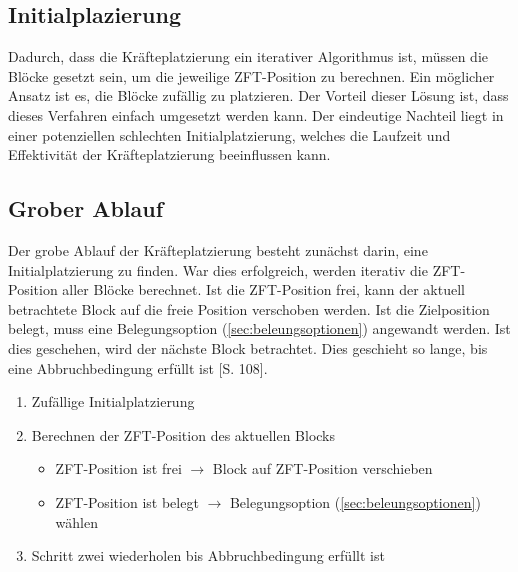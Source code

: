         \subsection{Initialplazierung}
            Dadurch, dass die Kräfteplatzierung ein iterativer Algorithmus ist,
            müssen die Blöcke gesetzt sein, um die jeweilige ZFT-Position zu berechnen.
            Ein möglicher Ansatz ist es, die Blöcke zufällig zu platzieren.
            Der Vorteil dieser Lösung ist, dass dieses Verfahren einfach umgesetzt werden kann.
            Der eindeutige Nachteil liegt in einer potenziellen schlechten Initialplatzierung,
            welches die Laufzeit und Effektivität der Kräfteplatzierung beeinflussen kann.

        \subsection{Grober Ablauf}
            Der grobe Ablauf der Kräfteplatzierung besteht zunächst darin, eine Initialplatzierung zu finden.
            War dies erfolgreich, werden iterativ die ZFT-Position aller Blöcke berechnet.
            Ist die ZFT-Position frei, kann der aktuell betrachtete Block auf die freie Position verschoben werden.
            Ist die Zielposition belegt, muss eine Belegungsoption (\ref{sec:beleungsoptionen}) angewandt werden.
            Ist dies geschehen, wird der nächste Block betrachtet.
            Dies geschieht so lange, bis eine Abbruchbedingung erfüllt ist \cite{layout}[S. 108].

            \begin{enumerate}
                \item Zufällige Initialplatzierung
                \item Berechnen der ZFT-Position des aktuellen Blocks
                        \begin{itemize}
                            \item ZFT-Position ist frei $\rightarrow$ Block auf ZFT-Position verschieben 
                            \item ZFT-Position ist belegt $\rightarrow$ Belegungsoption (\ref{sec:beleungsoptionen}) wählen
                        \end{itemize}
                \item Schritt zwei wiederholen bis Abbruchbedingung erfüllt ist
            \end{enumerate}

